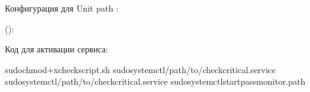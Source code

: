 \documentclass[letterpaper,10pt,russian]{sphinxmanual}
\begin{document}
\sphinxAtStartPar
Конфигурация для Unit path :

\sphinxAtStartPar
():

\begin{sphinxVerbatim}[commandchars=\\\{\}]


\end{sphinxVerbatim}

\sphinxAtStartPar
Код для активации сервиса:

\begin{sphinxVerbatim}[commandchars=\\\{\}]
sudochmod+xcheck\PYGZus{}script.sh
sudosystemctl/path/to/check\PYGZus{}critical.service
sudosystemctl/path/to/check\PYGZus{}critical.service
sudosystemctlstartpass\PYGZus{}monitor.path
\end{sphinxVerbatim}

\sphinxstepscope
\end{document}
